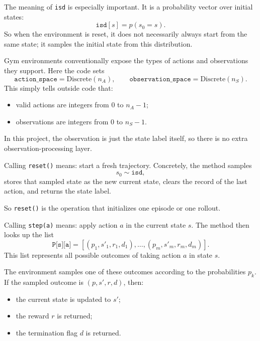 \documentclass[11pt]{article}
\begin{document}
The meaning of \texttt{isd} is especially important. It is a probability vector over initial
states:
\begin{equation}
    \texttt{isd}[s] = p(s_0 = s).
\end{equation}
So when the environment is reset, it does not necessarily always start from the same state; it
samples the initial state from this distribution.

Gym environments conventionally expose the types of actions and observations they support.
Here the code sets
\begin{equation}
    \texttt{action\_space} = \mathrm{Discrete}(n_A),
    \qquad
    \texttt{observation\_space} = \mathrm{Discrete}(n_S).
\end{equation}
This simply tells outside code that:
\begin{itemize}
    \item valid actions are integers from \(0\) to \(n_A-1\);
    \item observations are integers from \(0\) to \(n_S-1\).
\end{itemize}
In this project, the observation is just the state label itself, so there is no extra
observation-processing layer.

Calling \texttt{reset()} means: start a fresh trajectory. Concretely, the method samples
\begin{equation}
    s_0 \sim \texttt{isd},
\end{equation}
stores that sampled state as the new current state, clears the record of the last action, and
returns the state label.

So \texttt{reset()} is the operation that initializes one episode or one rollout.

Calling \texttt{step(a)} means: apply action \(a\) in the current state \(s\). The method then
looks up the list
\begin{equation}
    \texttt{P[s][a]} = [(p_1,s'_1,r_1,d_1),\dots,(p_m,s'_m,r_m,d_m)].
\end{equation}
This list represents all possible outcomes of taking action \(a\) in state \(s\).

The environment samples one of these outcomes according to the probabilities \(p_k\). If the
sampled outcome is \((p,s',r,d)\), then:
\begin{itemize}
    \item the current state is updated to \(s'\);
    \item the reward \(r\) is returned;
    \item the termination flag \(d\) is returned.
\end{itemize}
\end{document}
